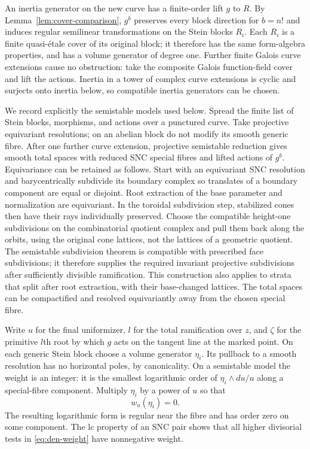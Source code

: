An inertia generator on the new curve has a finite-order lift $g$ to
$R$.  By Lemma~\ref{lem:cover-comparison}, $g^b$ preserves every
block direction for $b=n!$ and induces regular semilinear
transformations on the Stein blocks $R_i$.  Each $R_i$ is a finite
quasi-\'etale cover of its original block; it therefore has the same
form-algebra properties, and has a volume generator of degree one.
Further finite Galois curve extensions cause no obstruction: take
the composite Galois function-field cover and lift the actions.
Inertia in a tower of complex curve extensions is cyclic and
surjects onto inertia below, so compatible inertia generators can
be chosen.

We record explicitly the semistable models used below.  Spread the
finite list of Stein blocks, morphisms, and actions over a punctured
curve.  Take projective equivariant resolutions; on an abelian block
do not modify its smooth generic fibre.  After one further curve
extension, projective semistable reduction \cite{KKMSD1973} gives
smooth total spaces with reduced SNC special fibres and lifted
actions of $g^b$.  Equivariance can be retained as follows.  Start
with an equivariant SNC resolution and barycentrically subdivide its
boundary complex so translates of a boundary component are equal or
disjoint.  Root extraction of the base parameter and normalization
are equivariant.  In the toroidal subdivision step, stabilized cones
then have their rays individually preserved.  Choose the compatible
height-one subdivisions on the combinatorial quotient complex and
pull them back along the orbits, using the original cone lattices,
not the lattices of a geometric quotient.  The semistable subdivision
theorem is compatible with prescribed face subdivisions; it
therefore supplies the required invariant projective subdivisions
after sufficiently divisible ramification.  This construction also
applies to strata that split after root extraction, with their
base-changed lattices.  The total spaces can be compactified and
resolved equivariantly away from the chosen special fibre.

Write $u$ for the final uniformizer, $l$ for the total ramification
over $z$, and $\zeta$ for the primitive $l$th root by which $g$
acts on the tangent line at the marked point.  On each generic Stein
block choose a volume generator $\eta_i$.  Its pullback to a smooth
resolution has no horizontal poles, by canonicality.  On a
semistable model the weight is an integer: it is the smallest
logarithmic order of $\eta_i\wedge du/u$ along a special-fibre
component.  Multiply $\eta_i$ by a power of $u$ so that
\begin{equation}\label{eq:den-block-normalization}
 w_u(\eta_i)=0.
\end{equation}
The resulting logarithmic form is regular near the fibre and has
order zero on some component.  The lc property of an SNC pair
shows that all higher divisorial tests in
\eqref{eq:den-weight} have nonnegative weight.

